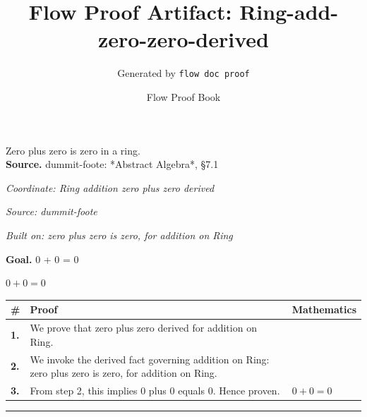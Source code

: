 \documentclass[11pt]{article}
\title{Flow Proof Artifact: Ring-add-zero-zero-derived}
\author{Generated by \texttt{flow doc proof}}
\date{Flow Proof Book}
\theoremstyle{definition}
\begin{document}
\maketitle
Zero plus zero is zero in a ring.\\[0.5em]
\textbf{Source.} dummit-foote: *Abstract Algebra*, §7.1\\[0.5em]
\bigskip
{}\par
\smallskip\noindent\textit{Coordinate: Ring \cdot addition \cdot zero plus zero derived}\par
\smallskip\noindent\textit{Source: dummit-foote}\par
\smallskip\noindent\textit{Built on: zero plus zero is zero, for addition on Ring}\par
\medskip
\noindent\textbf{Goal.} 0 + 0 = 0\par
\noindent$\displaystyle 0 + 0 = 0$\par
\medskip
\noindent
\begin{tabular}{@{} >{\raggedright\arraybackslash}p{} >{\raggedright\arraybackslash}p{} >{\raggedleft\arraybackslash}p{} @{}}
\textbf{\#} & \textbf{Proof} & \textbf{Mathematics} \\
\midrule
\textbf{1.} & We prove that zero plus zero derived for addition on Ring. & \\[0.45em]
\textbf{2.} & We invoke the derived fact governing addition on Ring: zero plus zero is zero, for addition on Ring. & \\[0.45em]
\textbf{3.} & From step 2, this implies 0 plus 0 equals 0. Hence proven. & $\displaystyle 0 + 0 = 0$ \\[0.45em]
\bottomrule
\end{tabular}
\label{thm:Ring-addition-zero_plus_zero_derived}
\par\medskip\hrule
\end{document}
